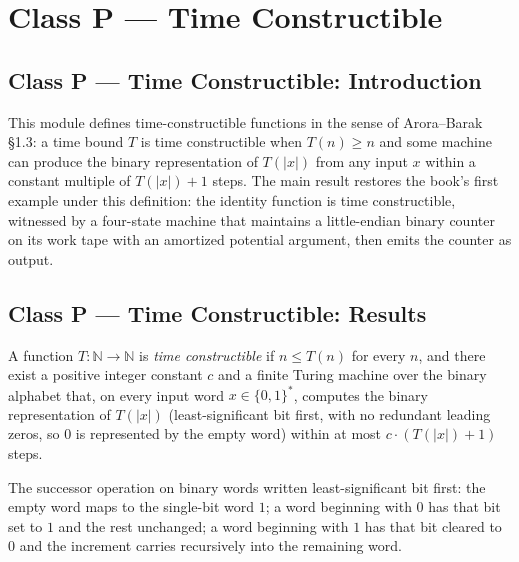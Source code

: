\section{Class P --- Time Constructible}
\subsection*{Class P --- Time Constructible: Introduction}

This module defines time-constructible functions in the sense of Arora--Barak
\S1.3: a time bound $T$ is time constructible when $T(n) \ge n$ and some machine
can produce the binary representation of $T(|x|)$ from any input $x$ within a
constant multiple of $T(|x|) + 1$ steps. The main result restores the book's
first example under this definition: the identity function is time
constructible, witnessed by a four-state machine that maintains a
little-endian binary counter on its work tape with an amortized potential
argument, then emits the counter as output.

\subsection*{Class P --- Time Constructible: Results}

\begin{definition}
\label{Complexity.TimeConstructible}
\leanok
{}
A function $T : \mathbb{N} \to \mathbb{N}$ is \emph{time constructible} if
$n \le T(n)$ for every $n$, and there exist a positive integer constant $c$ and
a finite Turing machine over the binary alphabet that, on every input word
$x \in \{0,1\}^{*}$, computes the binary representation of $T(|x|)$
(least-significant bit first, with no redundant leading zeros, so $0$ is
represented by the empty word) within at most $c \cdot (T(|x|) + 1)$ steps.
\end{definition}

\begin{definition}
\label{Complexity.counterInc}
\leanok
The successor operation on binary words written least-significant bit first:
the empty word maps to the single-bit word $1$; a word beginning with $0$ has
that bit set to $1$ and the rest unchanged; a word beginning with $1$ has that
bit cleared to $0$ and the increment carries recursively into the remaining
word.
\end{definition}

